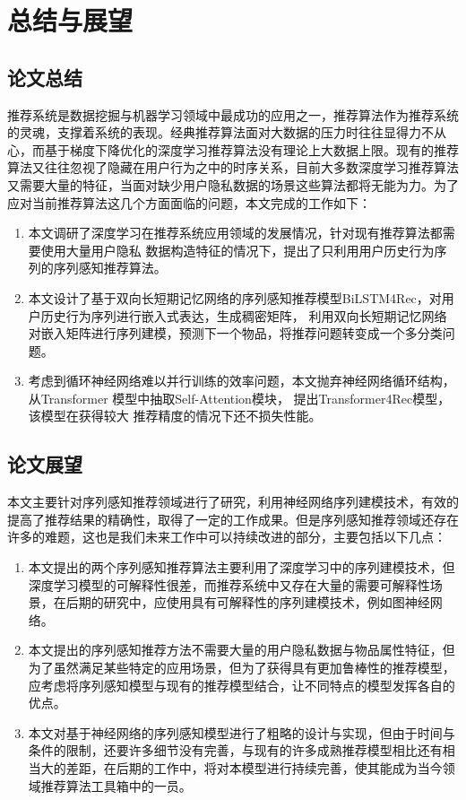 ﻿%
\chapter{总结与展望}
\label{chap:conclusion}

\section{论文总结}
推荐系统是数据挖掘与机器学习领域中最成功的应用之一，推荐算法作为推荐系统的灵魂，支撑着系统的表现。经典推荐算法面对大数据的压力时往往显得力不从心，而基于梯度下降优化的深度学习推荐算法没有理论上大数据上限。现有的推荐算法又往往忽视了隐藏在用户行为之中的时序关系，目前大多数深度学习推荐算法又需要大量的特征，当面对缺少用户隐私数据的场景这些算法都将无能为力。为了应对当前推荐算法这几个方面面临的问题，本文完成的工作如下：
\begin{enumerate}
    \item 本文调研了深度学习在推荐系统应用领域的发展情况，针对现有推荐算法都需要使用大量用户隐私%
          数据构造特征的情况下，提出了只利用用户历史行为序列的序列感知推荐算法。
    \item 本文设计了基于双向长短期记忆网络的序列感知推荐模型BiLSTM4Rec，对用户历史行为序列进行嵌入式表达，生成稠密矩阵，%
          利用双向长短期记忆网络对嵌入矩阵进行序列建模，预测下一个物品，将推荐问题转变成一个多分类问题。
    \item 考虑到循环神经网络难以并行训练的效率问题，本文抛弃神经网络循环结构，从Transformer
    	  模型中抽取Self-Attention模块，%
          提出Transformer4Rec模型，该模型在获得较大%
          推荐精度的情况下还不损失性能。
\end{enumerate}

\section{论文展望}

本文主要针对序列感知推荐领域进行了研究，利用神经网络序列建模技术，有效的提高了推荐结果的精确性，取得了一定的工作成果。但是序列感知推荐领域还存在许多的难题，这也是我们未来工作中可以持续改进的部分，主要包括以下几点：
\begin{enumerate}
    \item 本文提出的两个序列感知推荐算法主要利用了深度学习中的序列建模技术，但深度学习模型的可解释性很差，而推荐系统中又存在大量的需要可解释性场景，在后期的研究中，应使用具有可解释性的序列建模技术，例如图神经网络。
    \item 本文提出的序列感知推荐方法不需要大量的用户隐私数据与物品属性特征，但为了虽然满足某些特定的应用场景，但为了获得具有更加鲁棒性的推荐模型，应考虑将序列感知模型与现有的推荐模型结合，让不同特点的模型发挥各自的优点。
    \item 本文对基于神经网络的序列感知模型进行了粗略的设计与实现，但由于时间与条件的限制，还要许多细节没有完善，与现有的许多成熟推荐模型相比还有相当大的差距，在后期的工作中，将对本模型进行持续完善，使其能成为当今领域推荐算法工具箱中的一员。
\end{enumerate}
